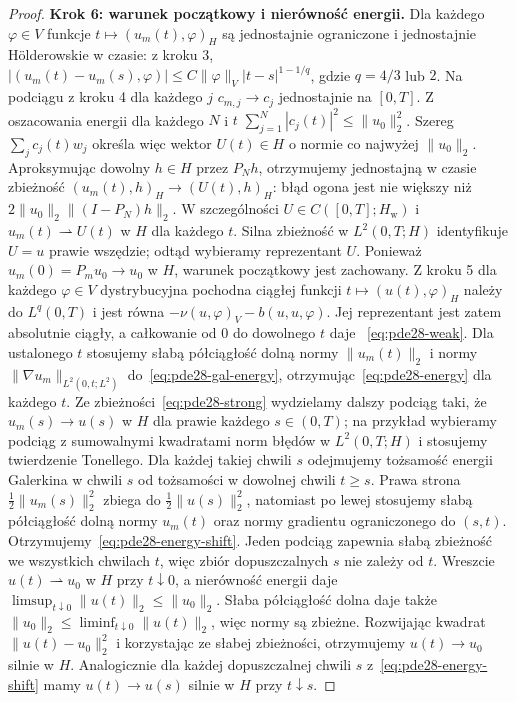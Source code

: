 \begin{proof}
\textbf{Krok 6: warunek początkowy i nierówność energii.}
Dla każdego $\varphi\in V$ funkcje
$t\mapsto(u_m(t),\varphi)_H$ są jednostajnie ograniczone
i jednostajnie Hölderowskie w czasie: z kroku 3,
$|(u_m(t)-u_m(s),\varphi)|\le
C\|\varphi\|_V|t-s|^{1-1/q}$, gdzie $q=4/3$ lub $2$.
Na podciągu z kroku 4 dla każdego $j$
$c_{m,j}\to c_j$ jednostajnie na $[0,T]$.
Z oszacowania energii dla każdego $N$ i $t$
$\sum_{j=1}^N|c_j(t)|^2\le\|u_0\|_2^2$.
Szereg $\sum_j c_j(t)w_j$ określa więc wektor
$U(t)\in H$ o normie co najwyżej $\|u_0\|_2$.
Aproksymując dowolny $h\in H$ przez $P_Nh$,
otrzymujemy jednostajną w czasie zbieżność
$(u_m(t),h)_H\to(U(t),h)_H$: błąd ogona
jest nie większy niż $2\|u_0\|_2\|(I-P_N)h\|_2$.
W szczególności $U\in C([0,T];H_{\mathrm w})$
i $u_m(t)\rightharpoonup U(t)$ w $H$ dla każdego $t$.
Silna zbieżność w $L^2(0,T;H)$ identyfikuje $U=u$
prawie wszędzie; odtąd wybieramy reprezentant $U$.
Ponieważ $u_m(0)=P_m u_0\to u_0$ w $H$,
warunek początkowy jest zachowany.
Z kroku 5 dla każdego $\varphi\in V$
dystrybucyjna pochodna ciągłej funkcji
$t\mapsto(u(t),\varphi)_H$ należy do $L^q(0,T)$
i jest równa $-\nu(u,\varphi)_V-b(u,u,\varphi)$.
Jej reprezentant jest zatem absolutnie ciągły,
a całkowanie od $0$ do dowolnego $t$ daje
~\eqref{eq:pde28-weak}.
Dla ustalonego $t$ stosujemy słabą półciągłość dolną
normy $\|u_m(t)\|_2$ i normy
$\|\nabla u_m\|_{L^2(0,t;L^2)}$ do~\eqref{eq:pde28-gal-energy},
otrzymując~\eqref{eq:pde28-energy} dla każdego $t$.
Ze zbieżności~\eqref{eq:pde28-strong} wydzielamy
dalszy podciąg taki, że $u_m(s)\to u(s)$ w $H$
dla prawie każdego $s\in(0,T)$; na przykład
wybieramy podciąg z sumowalnymi kwadratami
norm błędów w $L^2(0,T;H)$ i stosujemy twierdzenie
Tonellego. Dla każdej takiej chwili $s$ odejmujemy
tożsamość energii Galerkina w chwili $s$ od
tożsamości w dowolnej chwili $t\ge s$.
Prawa strona $\frac12\|u_m(s)\|_2^2$ zbiega
do $\frac12\|u(s)\|_2^2$, natomiast po lewej
stosujemy słabą półciągłość dolną normy $u_m(t)$
oraz normy gradientu ograniczonego do $(s,t)$.
Otrzymujemy~\eqref{eq:pde28-energy-shift}.
Jeden podciąg zapewnia słabą zbieżność
we wszystkich chwilach $t$, więc zbiór
dopuszczalnych $s$ nie zależy od $t$.
Wreszcie $u(t)\rightharpoonup u_0$ w $H$ przy $t\downarrow0$,
a nierówność energii daje
$\limsup_{t\downarrow0}\|u(t)\|_2\le\|u_0\|_2$.
Słaba półciągłość dolna daje także
$\|u_0\|_2\le\liminf_{t\downarrow0}\|u(t)\|_2$,
więc normy są zbieżne. Rozwijając kwadrat
$\|u(t)-u_0\|_2^2$ i korzystając ze słabej
zbieżności, otrzymujemy $u(t)\to u_0$ silnie w $H$.
Analogicznie dla każdej dopuszczalnej chwili $s$
z~\eqref{eq:pde28-energy-shift} mamy
$u(t)\to u(s)$ silnie w $H$ przy $t\downarrow s$.


\end{proof}
